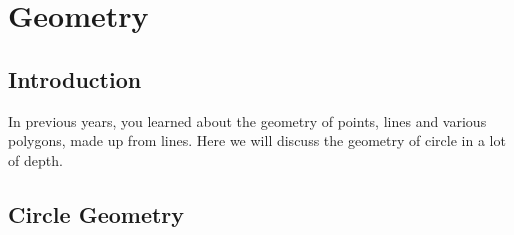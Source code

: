 \chapter{Geometry}
\label{m:g12}

\section{Introduction}

In previous years, you learned about the geometry of points, lines and
various polygons, made up from lines. Here we will discuss the geometry
of circle in a lot of depth.

\section{Circle Geometry}

